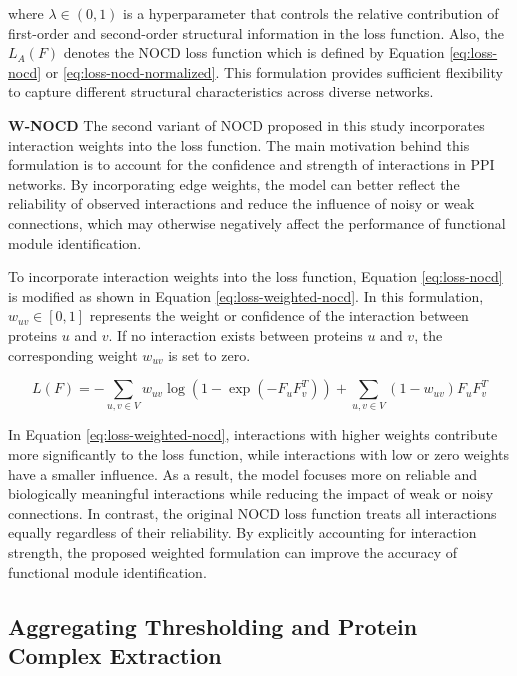 where \(\lambda \in (0,1)\) is a hyperparameter that controls the relative contribution of first-order and second-order structural information in the loss function. Also, the $L_A(F)$ denotes the NOCD loss function which is defined by Equation \ref{eq:loss-nocd} or \ref{eq:loss-nocd-normalized}. This formulation provides sufficient flexibility to capture different structural characteristics across diverse networks.

\textbf{W-NOCD} The second variant of NOCD proposed in this study incorporates interaction weights into the loss function. The main motivation behind this formulation is to account for the confidence and strength of interactions in PPI networks. By incorporating edge weights, the model can better reflect the reliability of observed interactions and reduce the influence of noisy or weak connections, which may otherwise negatively affect the performance of functional module identification.

To incorporate interaction weights into the loss function, Equation \ref{eq:loss-nocd} is modified as shown in Equation \ref{eq:loss-weighted-nocd}. In this formulation, \(w_{uv} \in [0,1]\) represents the weight or confidence of the interaction between proteins \(u\) and \(v\). If no interaction exists between proteins \(u\) and \(v\), the corresponding weight \(w_{uv}\) is set to zero.

\begin{equation}
	L(F) = -\sum_{u,v \in V} w_{uv} \log\left(1-\exp\left(-F_u F_v^T\right)\right)
	+ \sum_{u,v \in V} (1-w_{uv}) F_u F_v^T
	\label{eq:loss-weighted-nocd}
\end{equation}

In Equation \ref{eq:loss-weighted-nocd}, interactions with higher weights contribute more significantly to the loss function, while interactions with low or zero weights have a smaller influence. As a result, the model focuses more on reliable and biologically meaningful interactions while reducing the impact of weak or noisy connections. In contrast, the original NOCD loss function treats all interactions equally regardless of their reliability. By explicitly accounting for interaction strength, the proposed weighted formulation can improve the accuracy of functional module identification.


\subsection{Aggregating Thresholding and Protein Complex Extraction}

